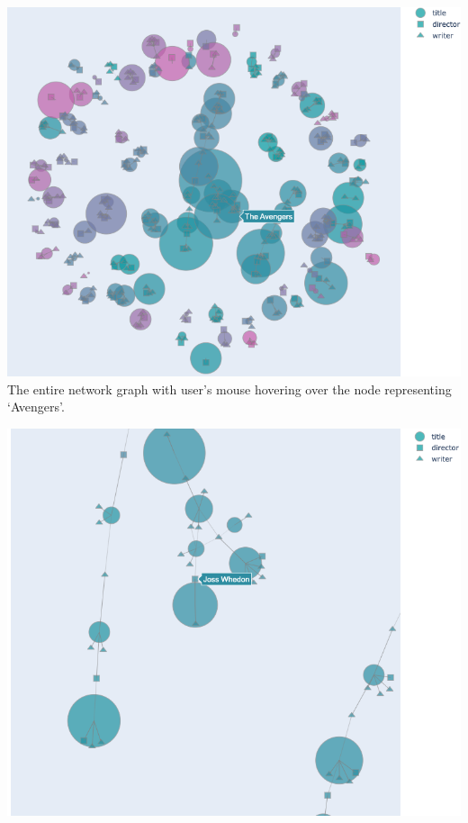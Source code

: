 \begin{tcolorbox}[top=10pt, colback=white, colframe=black, colbacktitle=black, center, enhanced, breakable,
attach boxed title to top left={yshift=-0.1in,xshift=0.15in},
boxed title style={boxrule=0pt,colframe=white,}, title=\DV]
\begin{minipage}[t]{0.45\linewidth}
\includegraphics[width=\linewidth, height=0.9\linewidth]{figures/data_vis_1.png}
\tiny The entire network graph with user's mouse hovering over the node representing `Avengers'.
\end{minipage}\hfill
\begin{minipage}[t]{0.4\linewidth}
\includegraphics[trim={0 0 3cm 0}, clip, width=\linewidth, height=1\linewidth]{figures/data_vis_2.png}

\end{minipage}
\end{tcolorbox}
